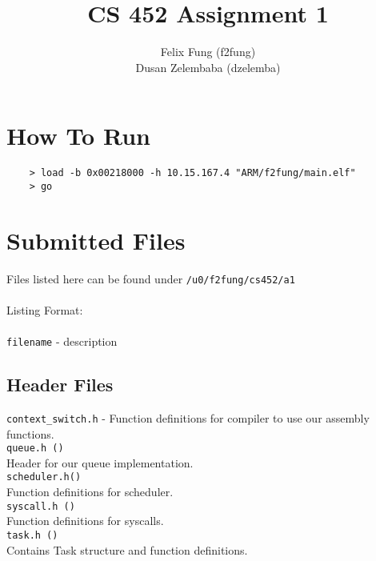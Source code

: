 \documentclass[letterpaper]{article}
\begin{document}
\title{CS 452 Assignment 1}
\author{Felix Fung (f2fung) \\ Dusan Zelembaba (dzelemba)}
\maketitle

\section{How To Run}
\begin{verbatim}
	> load -b 0x00218000 -h 10.15.167.4 "ARM/f2fung/main.elf"
	> go
\end{verbatim}

\section{Submitted Files}
Files listed here can be found under \verb!/u0/f2fung/cs452/a1!\\
\\
Listing Format:\\
\\
\verb!filename! - description

\subsection{Header Files}
\verb!context_switch.h! - Function definitions for compiler to use our assembly functions.\\
\verb!queue.h ()!\\
Header for our queue implementation.\\
\verb!scheduler.h()!\\
Function definitions for scheduler.\\
\verb!syscall.h ()!\\
Function definitions for syscalls.\\
\verb!task.h ()!\\
Contains Task structure and function definitions.\\
\end{document}
